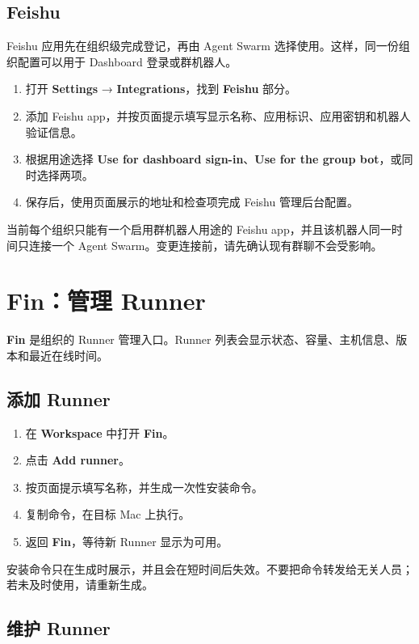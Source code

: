 \documentclass[UTF8,a4paper,11pt]{ctexart}
\begin{document}
\subsection{Feishu}

Feishu 应用先在组织级完成登记，再由 Agent Swarm 选择使用。这样，同一份组织配置可以用于 Dashboard 登录或群机器人。

\begin{enumerate}
  \item 打开 \textbf{Settings} → \textbf{Integrations}，找到 \textbf{Feishu} 部分。
  \item 添加 Feishu app，并按页面提示填写显示名称、应用标识、应用密钥和机器人验证信息。
  \item 根据用途选择 \textbf{Use for dashboard sign-in}、\textbf{Use for the group bot}，或同时选择两项。
  \item 保存后，使用页面展示的地址和检查项完成 Feishu 管理后台配置。
\end{enumerate}

当前每个组织只能有一个启用群机器人用途的 Feishu app，并且该机器人同一时间只连接一个 Agent Swarm。变更连接前，请先确认现有群聊不会受影响。

\section{Fin：管理 Runner}

\textbf{Fin} 是组织的 Runner 管理入口。Runner 列表会显示状态、容量、主机信息、版本和最近在线时间。

\subsection{添加 Runner}

\begin{enumerate}
  \item 在 \textbf{Workspace} 中打开 \textbf{Fin}。
  \item 点击 \textbf{Add runner}。
  \item 按页面提示填写名称，并生成一次性安装命令。
  \item 复制命令，在目标 Mac 上执行。
  \item 返回 \textbf{Fin}，等待新 Runner 显示为可用。
\end{enumerate}

安装命令只在生成时展示，并且会在短时间后失效。不要把命令转发给无关人员；若未及时使用，请重新生成。

\subsection{维护 Runner}
\end{document}
